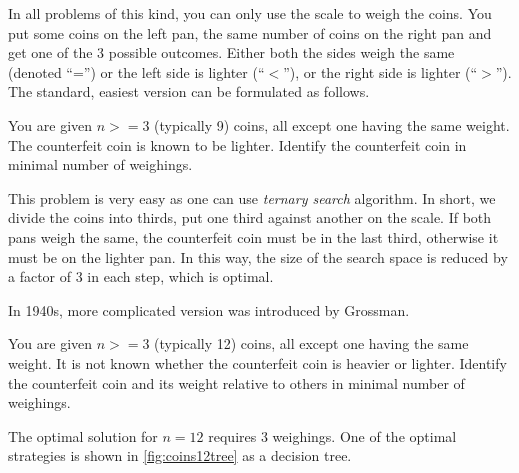 In all problems of this kind, you can only use the scale to weigh the coins.
You put some coins on the left pan, the same number of coins on the right pan
  and get one of the 3 possible outcomes.
Either both the sides weigh the same (denoted ``='')
  or the left side is lighter (``$<$''),
  or the right side is lighter (``$>$'').
The standard, easiest version can be formulated as follows.

\begin{problem} \label{pr:coins9}
You are given $n >= 3$ (typically 9) coins, all except one having the same weight.
The counterfeit coin is known to be lighter.
Identify the counterfeit coin in minimal number of weighings.
\end{problem}

This problem is very easy as one can use \emph{ternary search} algorithm.
In short, we divide the coins into thirds, put one third against another
  on the scale.
If both pans weigh the same, the counterfeit coin must be in the last third,
  otherwise it must be on the lighter pan.
In this way, the size of the search space is reduced
  by a factor of 3 in each step, which is optimal.

In 1940s, more complicated version was introduced by Grossman\cite{coins-grossman1945}.

\begin{problem} \label{pr:coins12}
You are given $n >= 3$ (typically 12) coins, all except one having the same weight.
It is not known whether the counterfeit coin is heavier or lighter.
Identify the counterfeit coin and its weight relative to others
  in minimal number of weighings.
\end{problem}

The optimal solution for $n=12$ requires 3 weighings.
One of the optimal
  strategies is shown in \autoref{fig:coins12tree} as a decision tree.

